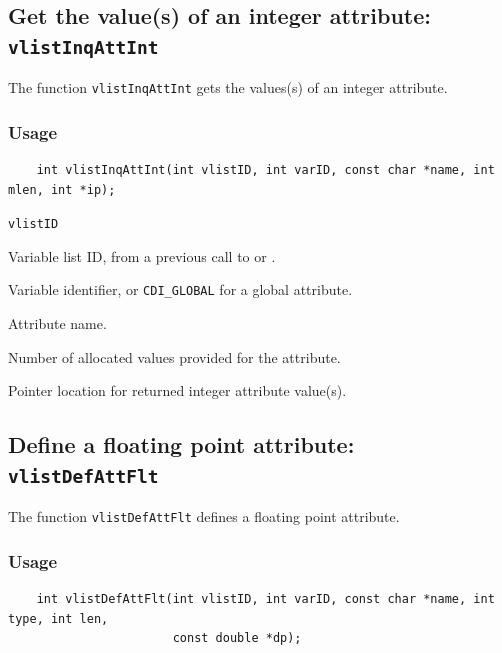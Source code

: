 \subsection{Get the value(s) of an integer attribute: {\tt vlistInqAttInt}}
\label{vlistInqAttInt}

The function {\tt vlistInqAttInt} gets the values(s) of an integer attribute.

\subsubsection*{Usage}

\begin{verbatim}
    int vlistInqAttInt(int vlistID, int varID, const char *name, int mlen, int *ip);
\end{verbatim}

\hspace*{4mm}\begin{minipage}[]{15cm}
\begin{deflist}{\tt vlistID\ }
\item[{\tt vlistID}]
Variable list ID, from a previous call to {} or {}.
\item[{\tt varID}]
Variable identifier, or {\tt CDI\_GLOBAL} for a global attribute.
\item[{\tt name}]
Attribute name.
\item[{\tt mlen}]
Number of allocated values provided for the attribute.
\item[{\tt ip}]
Pointer location for returned integer attribute value(s).

\end{deflist}
\end{minipage}


\subsection{Define a floating point attribute: {\tt vlistDefAttFlt}}
\label{vlistDefAttFlt}

The function {\tt vlistDefAttFlt} defines a floating point attribute.

\subsubsection*{Usage}

\begin{verbatim}
    int vlistDefAttFlt(int vlistID, int varID, const char *name, int type, int len, 
                       const double *dp);
\end{verbatim}

